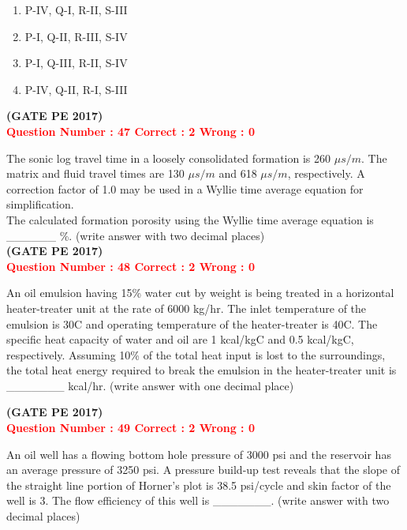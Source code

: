 \documentclass[12pt]{article}
\begin{document}
{\begin{enumerate}[label=(\Alph*)]
    \item P-IV, Q-I, R-II, S-III \\
    \item P-I, Q-II, R-III, S-IV \\
    \item P-I, Q-III, R-II, S-IV \\
    \item P-IV, Q-II, R-I, S-III
\end{enumerate}

\hfill\textbf{(GATE PE 2017)}\\[0.6cm]

\textcolor{red}{\textbf{Question Number : 47 \hfill Correct : 2  Wrong : 0}}

The sonic log travel time in a loosely consolidated formation is 260 $\mu s/m$. The matrix and fluid travel times are 130 $\mu s/m$ and 618 $\mu s/m$, respectively. A correction factor of 1.0 may be used in a Wyllie time average equation for simplification.\\[1ex]

The calculated formation porosity using the Wyllie time average equation is \_\_\_\_\_\_ \%. (write answer with two decimal places)\\

\hfill\textbf{(GATE PE 2017)}\\[0.6cm]

\textcolor{red}{\textbf{Question Number : 48 \hfill Correct : 2  Wrong : 0}}

An oil emulsion having 15\% water cut by weight is being treated in a horizontal heater-treater unit at the rate of 6000 kg/hr. The inlet temperature of the emulsion is 30\textdegree C and operating temperature of the heater-treater is 40\textdegree C. The specific heat capacity of water and oil are 1 kcal/kg\textdegree C and 0.5 kcal/kg\textdegree C, respectively. Assuming 10\% of the total heat input is lost to the surroundings, the total heat energy required to break the emulsion in the heater-treater unit is \_\_\_\_\_\_\_ kcal/hr. (write answer with one decimal place)

\hfill\textbf{(GATE PE 2017)}\\[0.6cm]


\textcolor{red}{\textbf{Question Number : 49 \hfill Correct : 2  Wrong : 0}}

An oil well has a flowing bottom hole pressure of 3000 psi and the reservoir has an average pressure of 3250 psi. A pressure build-up test reveals that the slope of the straight line portion of Horner’s plot is 38.5 psi/cycle and skin factor of the well is 3. The flow efficiency of this well is \_\_\_\_\_\_\_. (write answer with two decimal places)\\

}
\end{document}
